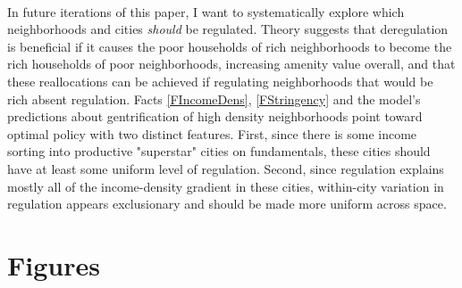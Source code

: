 \documentclass[12pt]{article}
\begin{document}
\paragraph*{}
	In future iterations of this paper, I want to systematically explore which neighborhoods and cities \textit{should} be regulated. Theory suggests that deregulation is beneficial if it causes the poor households of rich neighborhoods to become the rich households of poor neighborhoods, increasing amenity value overall, and that these reallocations can be achieved if regulating neighborhoods that would be rich absent regulation. Facts \ref{FIncomeDens}, \ref{FStringency} and the model's predictions about gentrification of high density neighborhoods point toward optimal policy with two distinct features. First, since there is some income sorting into productive "superstar" cities on fundamentals, these cities should have at least some uniform level of regulation. Second, since regulation explains mostly all of the income-density gradient in these cities, within-city variation in regulation appears exclusionary and should be made more uniform across space. 
	
	
	\newpage
	\scriptsize
	
	
	
	\newpage
	\section*{Figures}
	
\end{document}
